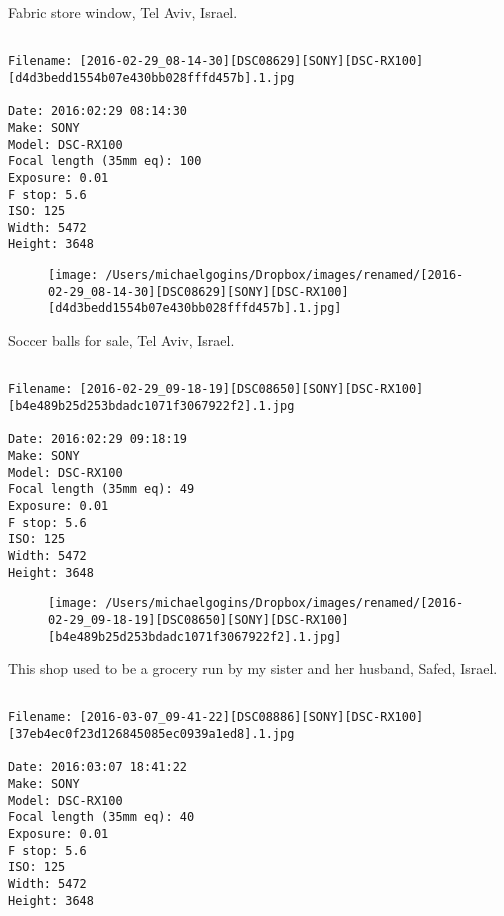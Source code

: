 \documentclass[11pt,letter,DIV=14,paper=landscape]{scrbook}
\begin{document}
\clearpage
\noindent Fabric store window, Tel Aviv, Israel.
\noindent
\begin{lstlisting}

Filename: [2016-02-29_08-14-30][DSC08629][SONY][DSC-RX100][d4d3bedd1554b07e430bb028fffd457b].1.jpg

Date: 2016:02:29 08:14:30
Make: SONY
Model: DSC-RX100
Focal length (35mm eq): 100
Exposure: 0.01
F stop: 5.6
ISO: 125
Width: 5472
Height: 3648
\end{lstlisting}
\clearpage

\begin{figure}
\texttt{[image: /Users/michaelgogins/Dropbox/images/renamed/[2016-02-29\_08-14-30][DSC08629][SONY][DSC-RX100][d4d3bedd1554b07e430bb028fffd457b].1.jpg]}
\end{figure}
    
\clearpage
\noindent Soccer balls for sale, Tel Aviv, Israel.
\noindent
\begin{lstlisting}

Filename: [2016-02-29_09-18-19][DSC08650][SONY][DSC-RX100][b4e489b25d253bdadc1071f3067922f2].1.jpg

Date: 2016:02:29 09:18:19
Make: SONY
Model: DSC-RX100
Focal length (35mm eq): 49
Exposure: 0.01
F stop: 5.6
ISO: 125
Width: 5472
Height: 3648
\end{lstlisting}
\clearpage

\begin{figure}
\texttt{[image: /Users/michaelgogins/Dropbox/images/renamed/[2016-02-29\_09-18-19][DSC08650][SONY][DSC-RX100][b4e489b25d253bdadc1071f3067922f2].1.jpg]}
\end{figure}
    
\clearpage
\noindent This shop used to be a grocery run by my sister and her husband, Safed, Israel.
\noindent
\begin{lstlisting}

Filename: [2016-03-07_09-41-22][DSC08886][SONY][DSC-RX100][37eb4ec0f23d126845085ec0939a1ed8].1.jpg

Date: 2016:03:07 18:41:22
Make: SONY
Model: DSC-RX100
Focal length (35mm eq): 40
Exposure: 0.01
F stop: 5.6
ISO: 125
Width: 5472
Height: 3648
\end{lstlisting}
\clearpage
\end{document}
